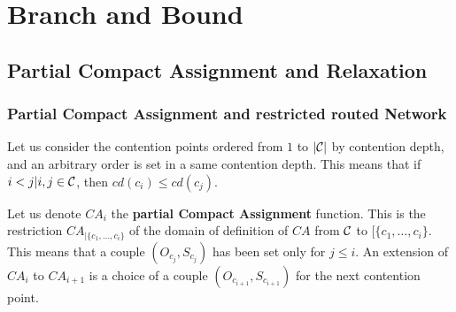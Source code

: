  

\section{Branch and Bound}

\subsection{Partial Compact Assignment and Relaxation}
\begin{comment}
D'abord introduire la notion de solution partielle avec seulement les temps d'attente fixée
sur seulement une partie des sommets de contention (dans l'ordre des niveaux de contention).

Puis définir le graphe associé à une solution partielle, en enlevant les sommets déjà traités 
et en mettant à jour les délais. Un exemple serait le bienvenu.

Donner la relaxation du problème général au problème sur un point de contention, 
c'est à dire remplacer tous les chemins vers et depuis le sommet par un arc de la même longueur.
Expliquer que la solution optimale pour le problème relaxé est meilleure (borne supérieure) de
ce qu'on cherche. On définit ensuite une borne supérieure meilleure en faisant le max des 
relaxations pour tous les points de contention. Expliquer que cette borne se calcule facilement
en pratique (algo Simmons FPT vs algo Branch and Bound simplifié).
\end{comment}
\subsubsection{Partial Compact Assignment and restricted routed Network}

Let us consider the contention points ordered from $1$ to $|{\cal C}|$ by contention depth, and an arbitrary order is set in a same contention depth. This means that if $i < j | i,j\in{\cal C}$, then  $cd(c_i) \leq cd(c_j)$. 


Let us denote $CA_i$ the \textbf{partial Compact Assignment} function. This is the restriction $CA_{|\{c_1,\ldots,c_i\}}$  of the domain of definition of $CA$ from ${\cal C}$ to $[\{c_1,\ldots,c_i\}$. This means that a couple $(O_{c_j},S_{c_j})$ has been set only for $j \leq i$.
An extension of $CA_i$ to $CA_{i+1}$ is a choice of a couple $(O_{c_{i+1}},S_{c_{i+1}})$ for the next contention point.

